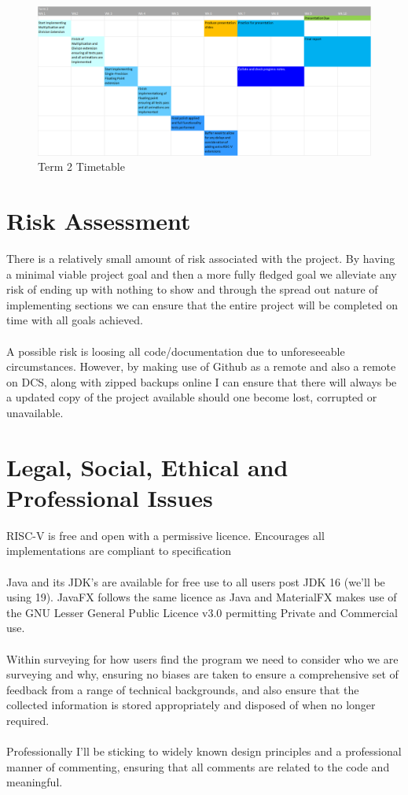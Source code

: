 \documentclass[a4paper,fleqn,12pt]{article}
\begin{document}
\begin{figure}[H]
    \centering
    \includegraphics[angle=90, scale=0.75]{specification/t2.png}
    \caption{Term 2 Timetable}
    \label{fig:timetable_t2}
\end{figure}


\section{Risk Assessment}
There is a relatively small amount of risk associated with the project. By having a minimal viable project goal and then a more fully fledged goal we alleviate any risk of ending up with nothing to show and through the spread out nature of implementing sections we can ensure that the entire project will be completed on time with all goals achieved.
\\\\
A possible risk is loosing all code/documentation due to unforeseeable circumstances. However, by making use of Github as a remote and also a remote on DCS, along with zipped backups online I can ensure that there will always be a updated copy of the project available should one become lost, corrupted or unavailable.



\section{Legal, Social, Ethical and Professional Issues}
RISC-V is free and open with a permissive licence. Encourages all implementations are compliant to specification \cite{risc_spec} 
\\\\
Java and its JDK's are available for free use to all users post JDK 16 (we'll be using 19). JavaFX follows the same licence as Java and MaterialFX makes use of the GNU Lesser General Public Licence v3.0 permitting Private and Commercial use.
\\\\
Within surveying for how users find the program we need to consider who we are surveying and why, ensuring no biases are taken to ensure a comprehensive set of feedback from a range of technical backgrounds, and also ensure that the collected information is stored appropriately and disposed of when no longer required.
\\\\
Professionally I'll be sticking to widely known design principles and a professional manner of commenting, ensuring that all comments are related to the code and meaningful.




\end{document}
